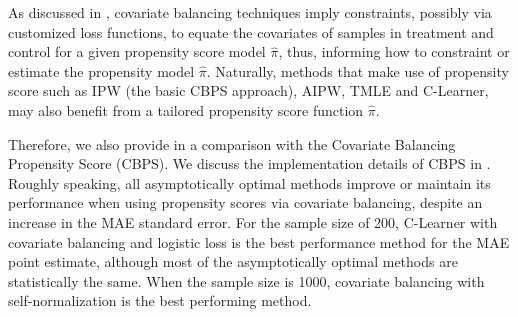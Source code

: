 As discussed in , covariate balancing techniques imply constraints, possibly via customized loss functions, to equate the covariates of samples in treatment and control for a given propensity score model $\hat \pi$, thus, informing how to constraint or estimate the propensity model $\hat \pi$. Naturally, methods that make use of propensity score such as IPW (the basic CBPS approach), AIPW, TMLE and C-Learner, may also benefit from a tailored propensity score function $\hat \pi$. 

Therefore, we also provide in  a comparison with the Covariate Balancing Propensity Score (CBPS). We discuss the implementation details of CBPS in . Roughly speaking, all asymptotically optimal methods improve or maintain its performance when using propensity scores via covariate balancing, despite an increase in the MAE standard error. For the sample size of 200, C-Learner with covariate balancing and logistic loss is the best performance method for the MAE point estimate, although most of the asymptotically optimal methods are statistically the same. When the sample size is 1000, covariate balancing with self-normalization is the best performing method. %
\label{sec:linear_cbps_ks-end}
\ifdefined\response\newpage\newpage\clearpage\pagebreak\else\fi
